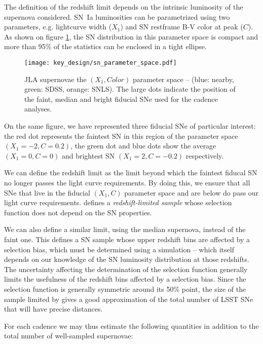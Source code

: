The definition of the redshift limit depends on the intrinsic
luminosity of the supernova considered.  SN~Ia luminosities can be
parametrized using two parameters, e.g. lightcurve width ($X_1$) and
SN restframe B-V color at peak ($C$).  As shown on figure
\ref{fig:jla_X1_C}, the SN distribution in this parameter space is
compact and more than 95\% of the statistics can be enclosed in a
tight ellipse. 

\begin{figure}
  \begin{center}
    \texttt{[image: key\_design/sn\_parameter\_space.pdf]}
    \caption{JLA supernovae the $(X_1,Color)$ parameter space --
      (blue: nearby, green: SDSS, orange: SNLS).  The large dots
      indicate the position of the faint, median and bright fiducial
      SNe used for the cadence analyses.}
    \label{fig:jla_X1_C}
  \end{center}
\end{figure}

On the same figure, we have represented three fiducial SNe of
particular interest: the red dot represents the faintest SN in this
region of the parameter space $(X_1=-2, C=0.2)$, the green dot and
blue dots show the average $(X_1=0, C=0)$ and brightest SN $(X_1=2,
C=-0.2)$ respectively.

We can define the redshift limit \zfaint as the limit beyond which the
faintest fiducal SN no longer passes the light curve requirements. By
doing this, we ensure that all SNe that live in the fiducial $(X_1,C)$
parameter space and are below \zfaint do pass our light curve
requirements.  \zfaint defines a {\em redshift-limited sample} whose
selection function does not depend on the SN properties.

We can also define a similar limit, using the median supernova,
instead of the faint one.  This defines a SN sample whose upper
redshift bins are affected by a selection bias, which must be
determined using a simulation -- which itself depends on our knowledge
of the SN luminosity distribution at those redshifts.  The uncertainty
affecting the determination of the selection function generally limits
the usefulness of the redshift bins affected by a selection bias.
Since the selection function is generally symmetric around its 50\%
point, the size of the sample limited by \zmed gives a good
approximation of the total number of LSST SNe that will have precise
distances.

For each cadence we may thus estimate the following quantities in addition to the total number of well-sampled supernovae: 

